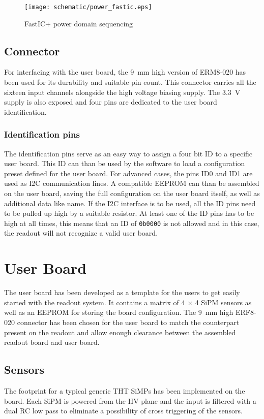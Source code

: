 \FloatBarrier
\begin{figure}[htp!]
    \centering
    \texttt{[image: schematic/power\_fastic.eps]}
    \caption{FastIC+ power domain sequencing}
    \label{fig:fastic_triggers}
\end{figure}
\FloatBarrier

\subsection{Connector}
For interfacing with the user board, the \SI{9}{\milli\meter} high version of ERM8-020 has been used for its durability and suitable pin count. This connector carries all the sixteen input channels alongside the high voltage biasing supply. The \SI{3.3}{\volt} supply is also exposed and four pins are dedicated to the user board identification.
\subsubsection{Identification pins}
The identification pins serve as an easy way to assign a four bit ID to a specific user board. This ID can than be used by the software to load a configuration preset defined for the user board. For advanced cases, the pins ID0 and ID1 are used as I2C communication lines. A compatible EEPROM can than be assembled on the user board, saving the full configuration on the user board itself, as well as additional data like name. If the I2C interface is to be used, all the ID pins need to be pulled up high by a suitable resistor. At least one of the ID pins has to be high at all times, this means that an ID of \verb|0b0000| is not allowed and in this case, the readout will not recognize a valid user board. 
%
\section{User Board}
The user board has been developed as a template for the users to get easily started with the readout system. It contains a matrix of 4 $\times$ 4 SiPM sensors as well as an EEPROM for storing the board configuration. The \SI{9}{\milli\meter} high ERF8-020 connector has been chosen for the user board to match the counterpart present on the readout and allow enough clearance between the assembled readout board and user board.

\subsection{Sensors}
The footprint for a typical generic THT SiMPs has been implemented on the board. Each SiPM is powered from the HV plane and the input is filtered with a dual RC low pass to eliminate a possibility of cross triggering of the sensors. 


